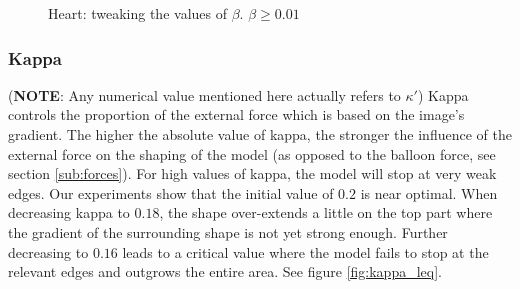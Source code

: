 \begin{figure}[!hbt]
\centering   
{}
\caption{Heart: tweaking the values of $ \beta $. $\beta \geq 0.01$}
\label{fig:beta_geq}
\end{figure}

\subsubsection{Kappa}

(\textbf{NOTE}: Any numerical value mentioned here actually refers to $ \kappa' $) Kappa controls the proportion of the external force which is based on the image's gradient. The higher the absolute value of kappa, the stronger the influence of the external force on the shaping of the model (as opposed to the balloon force, see section \ref{sub:forces}). For high values of kappa, the model will stop at very weak edges. Our experiments show that the initial value of $0.2$ is near optimal. When decreasing kappa to $0.18$, the shape over-extends a little on the top part where the gradient of the surrounding shape is not yet strong enough. Further decreasing to $0.16$ leads to a critical value where the model fails to stop at the relevant edges and outgrows the entire area. See figure \ref{fig:kappa_leq}.

